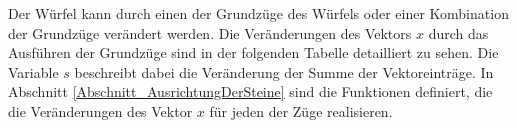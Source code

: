 \documentclass[12pt,a4paper, usenames, dvipsnames]{article}
\theoremstyle{mystyle}
\theoremstyle{definition}
\begin{document}


%
%
%
%
%
%
%
%
%
%


Der Würfel kann durch einen der Grundzüge des Würfels oder einer Kombination der Grundzüge verändert werden. Die Veränderungen des Vektors $x$ durch das Ausführen der Grundzüge sind in der folgenden Tabelle detailliert zu sehen. Die Variable $s$ beschreibt dabei die Veränderung der Summe der Vektoreinträge. In Abschnitt \ref{Abschnitt_AusrichtungDerSteine} sind die Funktionen definiert, die die Veränderungen des Vektor $x$ für jeden der Züge realisieren. 
\ \\
\end{document}
